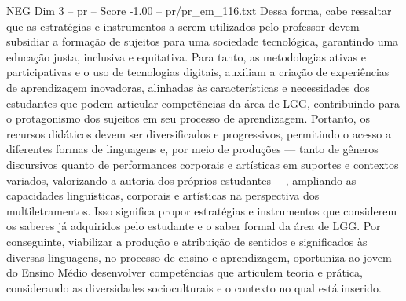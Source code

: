 \begin{textsample}{NEG Dim 3 – pr – Score -1.00 – pr/pr\_em\_116.txt}
Dessa forma, cabe ressaltar que as estratégias e instrumentos a serem utilizados pelo professor devem subsidiar a formação de sujeitos para uma sociedade tecnológica, garantindo uma educação justa, inclusiva e equitativa.
Para tanto, as metodologias ativas e participativas e o uso de tecnologias digitais, auxiliam a criação de experiências de aprendizagem inovadoras, alinhadas às características e necessidades dos estudantes que podem articular competências da área de LGG, contribuindo para o protagonismo dos sujeitos em seu processo de aprendizagem.
Portanto, os recursos didáticos devem ser diversificados e progressivos, permitindo o acesso a diferentes formas de linguagens e, por meio de produções — tanto de gêneros discursivos quanto de performances corporais e artísticas em suportes e contextos variados, valorizando a autoria dos próprios estudantes —, ampliando as capacidades linguísticas, corporais e artísticas na perspectiva dos multiletramentos.
Isso significa propor estratégias e instrumentos que considerem os saberes já adquiridos pelo estudante e o saber formal da área de LGG.
Por conseguinte, viabilizar a produção e atribuição de sentidos e significados às diversas linguagens, no processo de ensino e aprendizagem, oportuniza ao jovem do Ensino Médio desenvolver competências que articulem teoria e prática, considerando as diversidades socioculturais e o contexto no qual está inserido.

\end{textsample}
